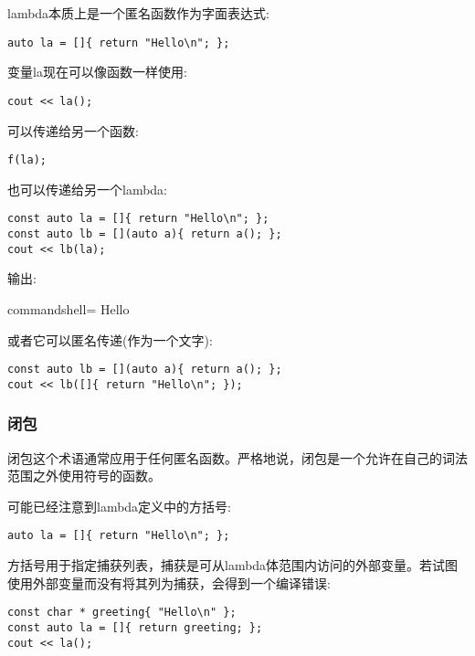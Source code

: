 
lambda本质上是一个匿名函数作为字面表达式:

\begin{lstlisting}[style=styleCXX]
auto la = []{ return "Hello\n"; };
\end{lstlisting}

变量la现在可以像函数一样使用:

\begin{lstlisting}[style=styleCXX]
cout << la();
\end{lstlisting}

可以传递给另一个函数:

\begin{lstlisting}[style=styleCXX]
f(la);
\end{lstlisting}

也可以传递给另一个lambda:

\begin{lstlisting}[style=styleCXX]
const auto la = []{ return "Hello\n"; };
const auto lb = [](auto a){ return a(); };
cout << lb(la);
\end{lstlisting}

输出:

\begin{tcblisting}{commandshell={}}
Hello
\end{tcblisting}

或者它可以匿名传递(作为一个文字):

\begin{lstlisting}[style=styleCXX]
const auto lb = [](auto a){ return a(); };
cout << lb([]{ return "Hello\n"; });
\end{lstlisting}

\subsubsection{闭包}

闭包这个术语通常应用于任何匿名函数。严格地说，闭包是一个允许在自己的词法范围之外使用符号的函数。

可能已经注意到lambda定义中的方括号:

\begin{lstlisting}[style=styleCXX]
auto la = []{ return "Hello\n"; };
\end{lstlisting}

方括号用于指定捕获列表，捕获是可从lambda体范围内访问的外部变量。若试图使用外部变量而没有将其列为捕获，会得到一个编译错误:

\begin{lstlisting}[style=styleCXX]
const char * greeting{ "Hello\n" };
const auto la = []{ return greeting; };
cout << la();
\end{lstlisting}

